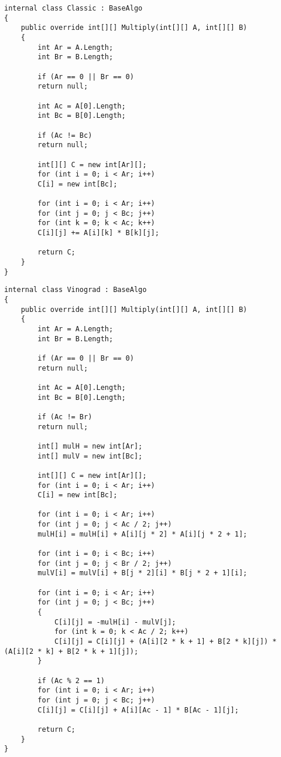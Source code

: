 \begin{lstlisting}[label=lst:classic,caption=Класс с реализацией классического алгоритма]
internal class Classic : BaseAlgo
{
	public override int[][] Multiply(int[][] A, int[][] B)
	{
		int Ar = A.Length;
		int Br = B.Length;
		
		if (Ar == 0 || Br == 0)
		return null;
		
		int Ac = A[0].Length;
		int Bc = B[0].Length;
		
		if (Ac != Bc)
		return null;
		
		int[][] C = new int[Ar][];
		for (int i = 0; i < Ar; i++)
		C[i] = new int[Bc];
		
		for (int i = 0; i < Ar; i++)
		for (int j = 0; j < Bc; j++)
		for (int k = 0; k < Ac; k++)
		C[i][j] += A[i][k] * B[k][j];
		
		return C;
	}
}
\end{lstlisting}

\begin{lstlisting}[label=lst:vino,caption= Класс с реализацией алгоритма Винограда]
internal class Vinograd : BaseAlgo
{
	public override int[][] Multiply(int[][] A, int[][] B)
	{
		int Ar = A.Length;
		int Br = B.Length;
		
		if (Ar == 0 || Br == 0)
		return null;
		
		int Ac = A[0].Length;
		int Bc = B[0].Length;
		
		if (Ac != Br)
		return null;
		
		int[] mulH = new int[Ar];
		int[] mulV = new int[Bc];
		
		int[][] C = new int[Ar][];
		for (int i = 0; i < Ar; i++)
		C[i] = new int[Bc];
		
		for (int i = 0; i < Ar; i++)
		for (int j = 0; j < Ac / 2; j++)
		mulH[i] = mulH[i] + A[i][j * 2] * A[i][j * 2 + 1];
		
		for (int i = 0; i < Bc; i++)
		for (int j = 0; j < Br / 2; j++)
		mulV[i] = mulV[i] + B[j * 2][i] * B[j * 2 + 1][i];
		
		for (int i = 0; i < Ar; i++)
		for (int j = 0; j < Bc; j++)
		{
			C[i][j] = -mulH[i] - mulV[j];
			for (int k = 0; k < Ac / 2; k++)
			C[i][j] = C[i][j] + (A[i][2 * k + 1] + B[2 * k][j]) * (A[i][2 * k] + B[2 * k + 1][j]);
		}
		
		if (Ac % 2 == 1)
		for (int i = 0; i < Ar; i++)
		for (int j = 0; j < Bc; j++)
		C[i][j] = C[i][j] + A[i][Ac - 1] * B[Ac - 1][j];
		
		return C;
	}
}
\end{lstlisting}


